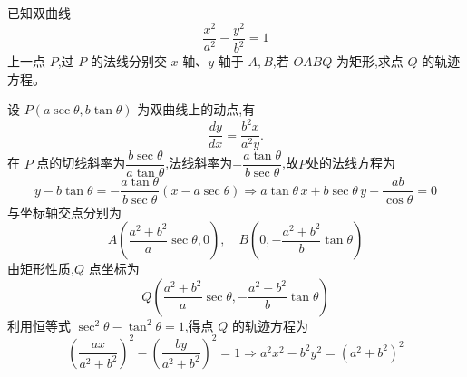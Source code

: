 \begin{questions}

    \question 已知双曲线 
    \[
    \frac{x^2}{a^2}-\frac{y^2}{b^2}=1
    \] 
    上一点 $P$,过 $P$ 的法线分别交 $x$ 轴、$y$ 轴于 $A,B$,若 $OABQ$ 为矩形,求点 $Q$ 的轨迹方程。
    \begin{solution}
        设 $P(a\sec\theta, b\tan\theta)$ 为双曲线上的动点,有
        \[
        \frac{dy}{dx} = \frac{b^2 x}{a^2 y}.
        \]
        在 $P$ 点的切线斜率为$\dfrac{b\sec\theta}{a\tan\theta}$,法线斜率为$-\dfrac{a\tan\theta}{b\sec\theta}$,故$P$处的法线方程为
        \[
        y - b\tan\theta = -\frac{a\tan\theta}{b\sec\theta} (x - a\sec\theta) \Rightarrow a\tan\theta\, x + b\sec\theta\, y - \frac{ab}{\cos\theta} = 0
        \]
        与坐标轴交点分别为
        \[
        A\left(\frac{a^2+b^2}{a}\sec\theta, 0\right),\quad B\left(0, -\frac{a^2+b^2}{b}\tan\theta\right)
        \]
        由矩形性质,$Q$ 点坐标为
        \[
        Q\left(\frac{a^2+b^2}{a}\sec\theta, -\frac{a^2+b^2}{b}\tan\theta \right)
        \]
        利用恒等式 $\sec^2\theta - \tan^2\theta = 1$,得点 $Q$ 的轨迹方程为
        \[
        \left(\frac{ax}{a^2+b^2}\right)^2 - \left(\frac{by}{a^2+b^2}\right)^2 = 1 \Rightarrow a^2 x^2 - b^2 y^2 = (a^2+b^2)^2
        \]
    \end{solution}


\end{questions}
